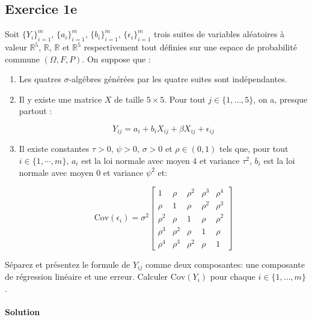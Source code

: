 \documentclass[../main.tex]{subfiles}
\begin{document}
\begin{CJK*}{UTF8}{gbsn}
\section*{Exercice 1e}
Soit $\{Y_i\}_{i=1}^m$, $\{a_i\}_{i=1}^m$, $\{b_i\}_{i=1}^m$, $\{\epsilon_i\}_{i=1}^m$
trois suites de variables aléatoires à valeur $\mathbb{R}^5$, $\mathbb{R}$, $\mathbb{R}$ et $\mathbb{R}^5$
respectivement tout définies sur une espace de probabilité commune $(\Omega, F, P)$. 
On suppose que :

\begin{enumerate}
    \item Les quatres $\sigma$-algébres générées par les quatre suites sont indépendantes.
    \item Il y existe une matrice $X$ de taille $5 \times 5$. Pour tout $j \in \{1, \dots, 5\}$, on a, presque partout :
    
    \begin{equation*}
        Y_{ij} = a_i + b_i X_{ij} + \beta X_{ij} + \epsilon_{ij}
    \end{equation*}
    \item Il existe constantes $\tau > 0$, $\psi > 0$, $\sigma > 0$ et $\rho \in (0,1)$ tels que, 
    pour tout $i \in \{1, \cdots, m\}$,
    $a_i$ est la loi normale avec moyen $4$ et variance $\tau^2$, 
    $b_i$ est la loi normale avec moyen $0$ et variance $\psi^2$ et:

    \begin{equation*}
        \text{Cov}(\epsilon_{i}) = \sigma^2
        \begin{bmatrix}
            1 & \rho & \rho^2 & \rho^3 & \rho^4 \\
            \rho & 1 & \rho & \rho^2 & \rho^3 \\
            \rho^2 & \rho & 1 & \rho & \rho^2 \\
            \rho^3 & \rho^2 & \rho & 1 & \rho \\
            \rho^4 & \rho^3 & \rho^2 & \rho & 1
        \end{bmatrix}
    \end{equation*}
\end{enumerate}

Séparez et présentez le formule de $Y_{ij}$ comme deux composantes: une composante de régression
linéaire et une erreur. Calculer $\text{Cov}(Y_i)$ pour chaque $i \in \{1, \dots, m\}$.

\paragraph{Solution} 


\end{CJK*}
\end{document}
